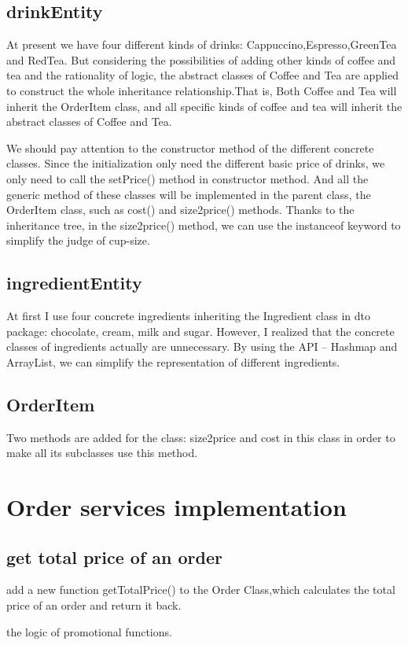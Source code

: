 \documentclass[a4paper]{report}
\begin{document}
\subsection{drinkEntity}
\par At present we have four different kinds of drinks: Cappuccino,Espresso,GreenTea and RedTea. But considering the possibilities of adding other kinds of coffee and tea and the rationality of logic, the abstract classes of Coffee and Tea are applied to construct the whole inheritance relationship.That is, Both Coffee and Tea will inherit the OrderItem class, and all specific kinds of coffee and tea will inherit the abstract classes of Coffee and Tea.
\par We should pay attention to the constructor method of the different concrete classes. Since the initialization only need the different basic price of drinks, we only need to call the setPrice() method in constructor method. And all the generic method of these classes will be implemented in the parent class, the OrderItem class, such as cost() and size2price() methods.
Thanks to the inheritance tree, in the size2price() method, we can use the instanceof keyword to simplify the judge of cup-size.
\subsection{ingredientEntity}
At first I use four concrete ingredients inheriting the Ingredient class in dto package: chocolate, cream, milk and sugar. However, I realized that the concrete classes of ingredients actually are unnecessary. By using the API -- Hashmap and ArrayList, we can simplify the representation of different ingredients.
\subsection{OrderItem}
 Two methods are added for the class: size2price and cost in this class in order to make all its subclasses use this method.

\section{Order services implementation}
\subsection{get total price of an order}
add a new function getTotalPrice() to the Order Class,which calculates the total price of an order and return it back. 
\par the logic of promotional functions.
\end{document}
